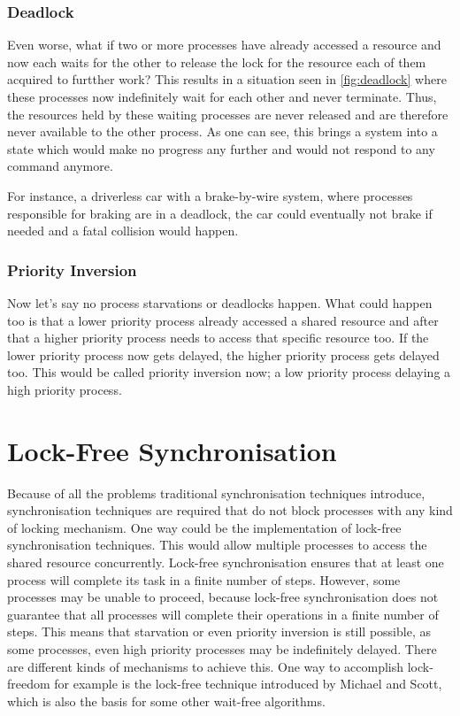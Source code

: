 \subsubsection{Deadlock}\label{subsubsec:deadlock}

Even worse, what if two or more processes have already accessed a resource and now each waits for the other to release the lock for the resource each of them acquired to furtther work? This results in a situation seen in \cref{fig:deadlock} where these processes now indefinitely wait for each other and never terminate. Thus, the resources held by these waiting processes are never released and are therefore never available to the other process. As one can see, this brings a system into a state which would make no progress any further and would not respond to any command anymore. \cite{chahar2013deadlock}

For instance, a driverless car with a brake-by-wire system, where processes responsible for braking are in a deadlock, the car could eventually not brake if needed and a fatal collision would happen. 


\subsubsection{Priority Inversion}\label{subsubsec:priority-inversion}

Now let's say no process starvations or deadlocks happen. What could happen too is that a lower priority process already accessed a shared resource and after that a higher priority process needs to access that specific resource too. If the lower priority process now gets delayed, the higher priority process gets delayed too. This would be called priority inversion now; a low priority process delaying a high priority process. \cite{priorityInversion}

\section{Lock-Free Synchronisation}\label{sec:lock-free}

Because of all the problems traditional synchronisation techniques introduce, synchronisation techniques are required that do not block processes with any kind of locking mechanism. One way could be the implementation of lock-free synchronisation techniques. This would allow multiple processes to access the shared resource concurrently. Lock-free synchronisation ensures that at least one process will complete its task in a finite number of steps. However, some processes may be unable to proceed, because lock-free synchronisation does not guarantee that all processes will complete their operations in a finite number of steps. This means that starvation or even priority inversion is still possible, as some processes, even high priority processes may be indefinitely delayed. There are different kinds of mechanisms to achieve this. One way to accomplish lock-freedom for example is the lock-free technique introduced by Michael and Scott, which is also the basis for some other wait-free algorithms.

